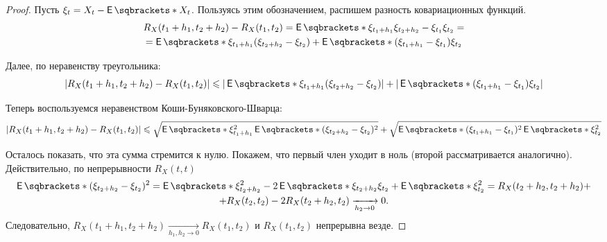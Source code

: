 \begin{leftbar}
\begin{small}\noindent
\begin{proof}
	Пусть \(\xi_{t} = X_{t} - \E{X_{t}}\). Пользуясь этим обозначением, 
	распишем разность ковариационных функций.
	\begin{multline*}
		R_{X}(t_{1} + h_{1}, t_{2} + h_{2}) - R_{X}(t_{1}, t_{2}) = 
		\E{\xi_{t_{1} + h_{1}}\xi_{t_{2} + h_{2}} - \xi_{t_{1}}\xi_{t_{2}}} = 
		\\ = \E{\xi_{t_{1} + h_{1}}(\xi_{t_{2} + h_{2}} - \xi_{t_{2}})} + 
		\E{(\xi_{t_{1} + h_{1}} - \xi_{t_{1}})\xi_{t_{2}}}
	\end{multline*}
	
	Далее, по неравенству треугольника:
	\[
		|R_{X}(t_{1} + h_{1}, t_{2} + h_{2}) - R_{X}(t_{1}, t_{2})| \leq 
		|\E{\xi_{t_{1} + h_{1}}(\xi_{t_{2} + h_{2}} - \xi_{t_{2}})}| + 
		|\E{(\xi_{t_{1} + h_{1}} - \xi_{t_{1}})\xi_{t_{2}}}|
	\]
	
	Теперь воспользуемся неравенством Коши-Буняковского-Шварца:
	\[
		|R_{X}(t_{1} + h_{1}, t_{2} + h_{2}) - R_{X}(t_{1}, t_{2})| \leq 
		\sqrt{\E{\xi_{t_{1} + 
		h_{1}}^{2}}\E{(\xi_{t_{2} + h_{2}} - \xi_{t_{2}})^{2}}} + 
		\sqrt{\E{(\xi_{t_{1} + h_{1}} - \xi_{t_{1}})^{2}}\E{\xi_{t_{2}}^{2}}}
	\]
	
	Осталось показать, что эта сумма стремится к нулю. Покажем, что первый член 
	уходит в ноль (второй рассматривается аналогично). Действительно, по 
	непрерывности \(R_{X}(t, t)\)
	\begin{multline*}
		\E{(\xi_{t_{2} + h_{2}} - \xi_{t_{2}})^{2}} = \E{\xi_{t_{2} + 
		h_{2}}^{2}} - 2\E{\xi_{t_{2} + h_{2}}\xi_{t_{2}}} + \E{\xi_{t_{2}}^{2}} 
		= R_{X}(t_{2} + h_{2}, t_{2} + h_{2}) + \\ + R_{X}(t_{2}, t_{2}) - 
		2R_{X}(t_{2} + h_{2}, t_{2}) \xrightarrow[h_{2} \to 0]{} 0.
	\end{multline*}
	Следовательно, \(R_{X}(t_{1} + h_{1}, t_{2} + h_{2}) \xrightarrow[h_{1}, 
	h_{2} \to 0]{} R_{X}(t_{1}, t_{2})\) и \(R_{X}(t_{1}, t_{2})\) непрерывна 
	везде.
\end{proof}
\end{small}
\end{leftbar}

